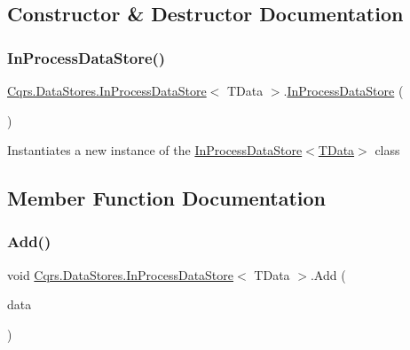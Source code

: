 \subsection{Constructor \& Destructor Documentation}
\mbox{\label{classCqrs_1_1DataStores_1_1InProcessDataStore_a86a0ef4945e0f2fa45027ceb3261d284_a86a0ef4945e0f2fa45027ceb3261d284}} 
\subsubsection{\texorpdfstring{In\+Process\+Data\+Store()}{InProcessDataStore()}}
{\footnotesize\ttfamily \hyperlink{classCqrs_1_1DataStores_1_1InProcessDataStore}{Cqrs.\+Data\+Stores.\+In\+Process\+Data\+Store}$<$ T\+Data $>$.\hyperlink{classCqrs_1_1DataStores_1_1InProcessDataStore}{In\+Process\+Data\+Store} (\begin{DoxyParamCaption}{ }\end{DoxyParamCaption})}



Instantiates a new instance of the \hyperlink{classCqrs_1_1DataStores_1_1InProcessDataStore_a86a0ef4945e0f2fa45027ceb3261d284_a86a0ef4945e0f2fa45027ceb3261d284}{In\+Process\+Data\+Store$<$\+T\+Data$>$} class 



\subsection{Member Function Documentation}
\mbox{\label{classCqrs_1_1DataStores_1_1InProcessDataStore_ade5c4033c628598665c0cba986a54c15_ade5c4033c628598665c0cba986a54c15}} 
\subsubsection{\texorpdfstring{Add()}{Add()}\hspace{0.1cm}{\footnotesize\ttfamily [1/2]}}
{\footnotesize\ttfamily void \hyperlink{classCqrs_1_1DataStores_1_1InProcessDataStore}{Cqrs.\+Data\+Stores.\+In\+Process\+Data\+Store}$<$ T\+Data $>$.Add (\begin{DoxyParamCaption}\item[{T\+Data}]{data }\end{DoxyParamCaption})}



